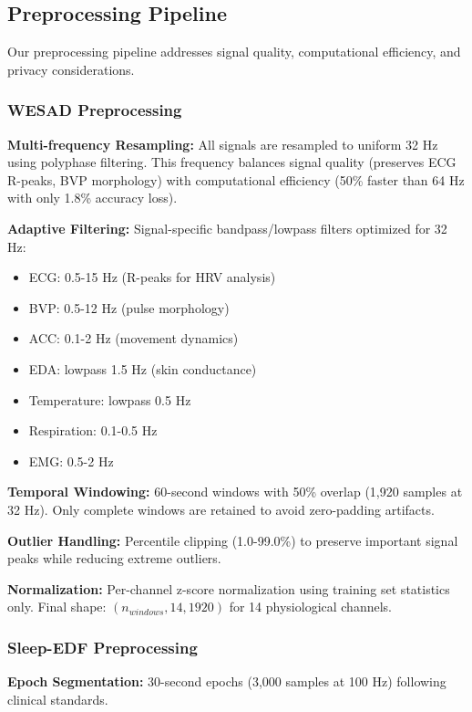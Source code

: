 \documentclass[conference]{IEEEtran}
\begin{document}
\subsection{Preprocessing Pipeline}

Our preprocessing pipeline addresses signal quality, computational efficiency, and privacy considerations.

\subsubsection{WESAD Preprocessing}

\textbf{Multi-frequency Resampling:} All signals are resampled to uniform 32 Hz using polyphase filtering. This frequency balances signal quality (preserves ECG R-peaks, BVP morphology) with computational efficiency (50\% faster than 64 Hz with only 1.8\% accuracy loss).

\textbf{Adaptive Filtering:} Signal-specific bandpass/lowpass filters optimized for 32 Hz:
\begin{itemize}
    \item ECG: 0.5-15 Hz (R-peaks for HRV analysis)
    \item BVP: 0.5-12 Hz (pulse morphology)
    \item ACC: 0.1-2 Hz (movement dynamics)
    \item EDA: lowpass 1.5 Hz (skin conductance)
    \item Temperature: lowpass 0.5 Hz
    \item Respiration: 0.1-0.5 Hz
    \item EMG: 0.5-2 Hz
\end{itemize}

\textbf{Temporal Windowing:} 60-second windows with 50\% overlap (1,920 samples at 32 Hz). Only complete windows are retained to avoid zero-padding artifacts.

\textbf{Outlier Handling:} Percentile clipping (1.0-99.0\%) to preserve important signal peaks while reducing extreme outliers.

\textbf{Normalization:} Per-channel z-score normalization using training set statistics only. Final shape: $(n_{windows}, 14, 1920)$ for 14 physiological channels.

\subsubsection{Sleep-EDF Preprocessing}

\textbf{Epoch Segmentation:} 30-second epochs (3,000 samples at 100 Hz) following clinical standards.
\end{document}
